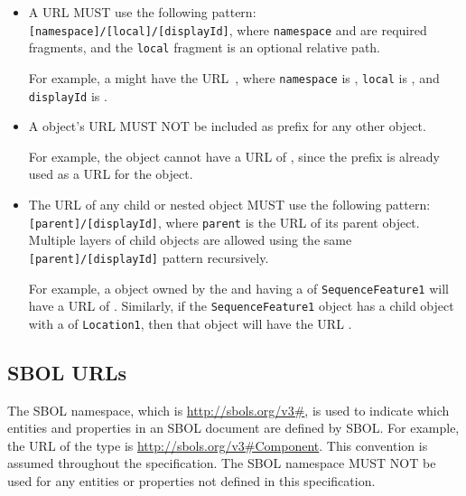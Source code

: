 \begin{itemize}

 \item A  URL MUST use the following pattern:
  \texttt{[namespace]/[local]/[displayId]},  where \texttt{namespace} and  are required fragments, and the \texttt{local} fragment is an optional relative path.

  	For example, a  might have the URL~, where \texttt{namespace} is , \texttt{local} is , and \texttt{displayId} is .

  \item A  object's URL MUST NOT be included as prefix for any other  object.

  	For example, the   object cannot have a URL of , since the  prefix is already used as a URL for the   object.

  \item The URL of any child or nested object MUST use the following pattern:\texttt{[parent]/[displayId]}, where \texttt{parent} is the URL of its parent object.
	Multiple layers of child objects are allowed using the same\\ \texttt{[parent]/[displayId]} pattern recursively.

	For example, a  object owned by the   and having a  of \texttt{SequenceFeature1} will have a URL of .
	Similarly, if the \texttt{SequenceFeature1} object has a  child object with a  of \texttt{Location1}, then that object will have the URL .
  \end{itemize}

\subsection{SBOL URLs}
  \label{sec:sbolURLs}
  
The SBOL namespace, which is \url{http://sbols.org/v3\#}, is used to indicate which entities and properties in an SBOL document are defined by SBOL. 
For example, the URL of the type  is \url{http://sbols.org/v3\#Component}. 
This convention is assumed throughout the specification.
The SBOL namespace MUST NOT be used for any entities or properties not defined in this specification.

